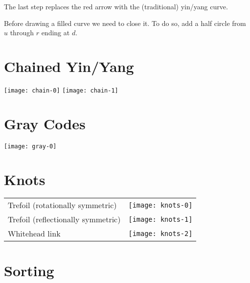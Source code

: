 \documentclass{article}
\begin{document}
The last step replaces the red arrow with the (traditional) yin/yang curve.

Before drawing a filled curve we need to close it.
To do so, add a half circle from $u$ through $r$ ending at $d$.

\section{Chained Yin/Yang}
\begin{center}
\texttt{[image: chain-0]}
\texttt{[image: chain-1]}
\end{center}

\section{Gray Codes}
\texttt{[image: gray-0]}

\section{Knots}
\begin{tabular}{lc}
Trefoil (rotationally symmetric)   & \texttt{[image: knots-0]} \\
Trefoil (reflectionally symmetric) & \texttt{[image: knots-1]} \\
Whitehead link                     & \texttt{[image: knots-2]} \\
\end{tabular}

\section{Sorting}
\end{document}

